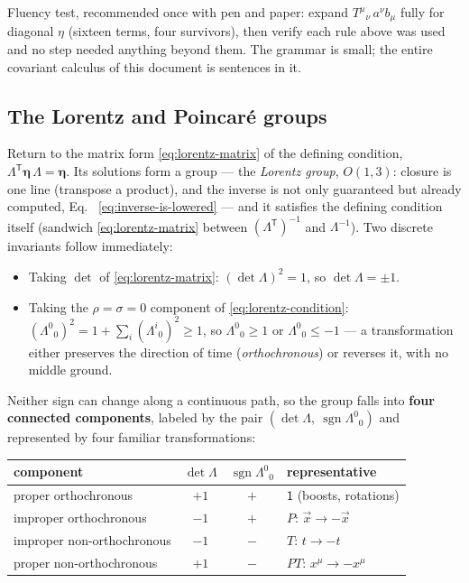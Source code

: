 \documentclass[11pt]{article}
\theoremstyle{plain}
\theoremstyle{definition}
\theoremstyle{remark}
\newcommand{\vx}{\vec{x}}
\begin{document}
\medskip
\noindent
Fluency test, recommended once with pen and paper: expand
$T^{\mu}{}_{\nu}\,a^\nu b_\mu$ fully for diagonal $\eta$ (sixteen
terms, four survivors), then verify each rule above was used and no
step needed anything beyond them. The grammar is small; the entire
covariant calculus of this document is sentences in it.

\subsection{The Lorentz and Poincar\'e groups}
\label{sec:lorentz-group}

Return to the matrix form \eqref{eq:lorentz-matrix} of the defining
condition,
$\mathsf\Lambda^{\mathsf T}\boldsymbol\eta\,\mathsf\Lambda
= \boldsymbol\eta$. Its solutions form a group --- the \emph{Lorentz
group}, $O(1,3)$: closure is one line (transpose a product), and the
inverse is not only guaranteed but already computed, Eq.~%
\eqref{eq:inverse-is-lowered} --- and it satisfies the defining
condition itself (sandwich \eqref{eq:lorentz-matrix} between
$(\mathsf\Lambda^{\mathsf T})^{-1}$ and $\mathsf\Lambda^{-1}$). Two
discrete invariants follow immediately:
\begin{itemize}
  \item Taking $\det$ of \eqref{eq:lorentz-matrix}:
  $(\det\mathsf\Lambda)^2 = 1$, so $\det\mathsf\Lambda = \pm 1$.
  \item Taking the $\rho = \sigma = 0$ component of
  \eqref{eq:lorentz-condition}:
  $(\Lambda^0{}_0)^2 = 1 + \sum_i (\Lambda^i{}_0)^2 \ge 1$, so
  $\Lambda^0{}_0 \ge 1$ or $\Lambda^0{}_0 \le -1$ --- a transformation
  either preserves the direction of time (\emph{orthochronous}) or
  reverses it, with no middle ground.
\end{itemize}
Neither sign can change along a continuous path, so the group falls
into \textbf{four connected components}, labeled by the pair
$(\det\mathsf\Lambda,\ \operatorname{sgn}\Lambda^0{}_0)$ and
represented by four familiar transformations:
\begin{center}
\begin{tabular}{lccl}
\toprule
component & $\det\mathsf\Lambda$ & $\operatorname{sgn}\Lambda^0{}_0$ & representative \\
\midrule
proper orthochronous & $+1$ & $+$ & $\mathsf 1$ (boosts, rotations) \\
improper orthochronous & $-1$ & $+$ & $P$: $\vx \to -\vx$ \\
improper non-orthochronous & $-1$ & $-$ & $T$: $t \to -t$ \\
proper non-orthochronous & $+1$ & $-$ & $PT$: $x^\mu \to -x^\mu$ \\
\bottomrule
\end{tabular}
\end{center}
\end{document}
